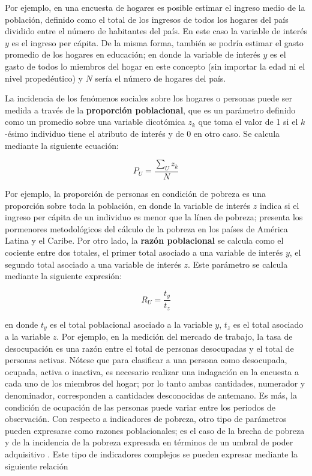 \documentclass[12pt,spanish,]{book}
\begin{document}
Por ejemplo, en una encuesta de hogares es posible estimar el ingreso medio de la población, definido como el total de los ingresos de todos los hogares del país dividido entre el número de habitantes del país. En este caso la variable de interés \(y\) es el ingreso per cápita. De la misma forma, también se podría estimar el gasto promedio de los hogares en educación; en donde la variable de interés \(y\) es el gasto de todos lo miembros del hogar en este concepto (sin importar la edad ni el nivel propedéutico) y \(N\) sería el número de hogares del país.

La incidencia de los fenómenos sociales sobre los hogares o personas puede ser medida a través de la \textbf{proporción poblacional}, que es un parámetro definido como un promedio sobre una variable dicotómica \(z_k\) que toma el valor de 1 si el \(k\)-ésimo individuo tiene el atributo de interés y de 0 en otro caso. Se calcula mediante la siguiente ecuación:

\[P_U=\frac{\sum_U z_k}{N}\]

Por ejemplo, la proporción de personas en condición de pobreza es una proporción sobre toda la población, en donde la variable de interés \(z\) indica si el ingreso per cápita de un individuo es menor que la línea de pobreza; \textcite{CEPAL_2018} presenta los pormenores metodológicos del cálculo de la pobreza en los países de América Latina y el Caribe. Por otro lado, la \textbf{razón poblacional} se calcula como el cociente entre dos totales, el primer total asociado a una variable de interés \(y\), el segundo total asociado a una variable de interés \(z\). Este parámetro se calcula mediante la siguiente expresión:

\[R_U=\frac{t_y}{t_z}\]

en donde \(t_y\) es el total poblacional asociado a la variable \(y\), \(t_z\) es el total asociado a la variable \(z\). Por ejemplo, en la medición del mercado de trabajo, la tasa de desocupación es una razón entre el total de personas desocupadas y el total de personas activas. Nótese que para clasificar a una persona como desocupada, ocupada, activa o inactiva, es necesario realizar una indagación en la encuesta a cada uno de los miembros del hogar; por lo tanto ambas cantidades, numerador y denominador, corresponden a cantidades desconocidas de antemano. Es más, la condición de ocupación de las personas puede variar entre los periodos de observación. Con respecto a indicadores de pobreza, otro tipo de parámetros pueden expresarse como razones poblacionales; es el caso de la brecha de pobreza y de la incidencia de la pobreza expresada en términos de un umbral de poder adquisitivo \autocite{Foster_Greer_Thorbecke_1984}. Este tipo de indicadores complejos se pueden expresar mediante la siguiente relación
\end{document}
